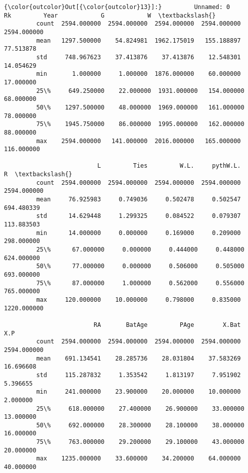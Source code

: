 \documentclass[11pt]{article}
\begin{document}
\begin{Verbatim}[commandchars=\\\{\}]
{\color{outcolor}Out[{\color{outcolor}13}]:}         Unnamed: 0           Rk         Year            G            W  \textbackslash{}
         count  2594.000000  2594.000000  2594.000000  2594.000000  2594.000000   
         mean   1297.500000    54.824981  1962.175019   155.188897    77.513878   
         std     748.967623    37.413876    37.413876    12.548301    14.054629   
         min       1.000000     1.000000  1876.000000    60.000000    17.000000   
         25\%     649.250000    22.000000  1931.000000   154.000000    68.000000   
         50\%    1297.500000    48.000000  1969.000000   161.000000    78.000000   
         75\%    1945.750000    86.000000  1995.000000   162.000000    88.000000   
         max    2594.000000   141.000000  2016.000000   165.000000   116.000000   
         
                          L         Ties         W.L.     pythW.L.            R  \textbackslash{}
         count  2594.000000  2594.000000  2594.000000  2594.000000  2594.000000   
         mean     76.925983     0.749036     0.502478     0.502547   694.480339   
         std      14.629448     1.299325     0.084522     0.079307   113.883503   
         min      14.000000     0.000000     0.169000     0.209000   298.000000   
         25\%      67.000000     0.000000     0.444000     0.448000   624.000000   
         50\%      77.000000     0.000000     0.506000     0.505000   693.000000   
         75\%      87.000000     1.000000     0.562000     0.556000   765.000000   
         max     120.000000    10.000000     0.798000     0.835000  1220.000000   
         
                         RA       BatAge         PAge        X.Bat          X.P  
         count  2594.000000  2594.000000  2594.000000  2594.000000  2594.000000  
         mean    691.134541    28.285736    28.031804    37.583269    16.696608  
         std     115.287832     1.353542     1.813197     7.951902     5.396655  
         min     241.000000    23.900000    20.000000    10.000000     2.000000  
         25\%     618.000000    27.400000    26.900000    33.000000    13.000000  
         50\%     692.000000    28.300000    28.100000    38.000000    16.000000  
         75\%     763.000000    29.200000    29.100000    43.000000    20.000000  
         max    1235.000000    33.600000    34.200000    64.000000    40.000000  
\end{Verbatim}
            
\end{document}
